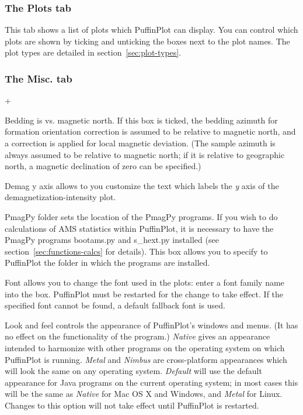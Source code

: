 \documentclass[a4paper,british]{article}
\newcommand{\menuitemlabel}[1]{%
\mbox{\textsf{#1}}\hfil}
\newenvironment{menuitemlist}%
{\begin{list}{}{%
\renewcommand{\makelabel}{\menuitemlabel}%
\setlength{\labelwidth}{35pt}%
\setlength{\leftmargin}%
             {\labelwidth+\labelsep}}}%
{\end{list}}
\newcommand{\ppcmd}[1]{\textsf{#1}} %
\newcommand{\caps}[1]{\MakeTextUppercase{#1}} %
\begin{document}
\subsubsection{The \ppcmd{Plots} tab}

This tab shows a list of plots which PuffinPlot can display. You can control
which plots are shown by ticking and unticking the boxes next to the plot
names. The plot types are detailed in section~\ref{sec:plot-types}.

\subsubsection{\label{sec:prefs-misc}The \ppcmd{Misc.} tab}

\begin{menuitemlist}

\item[Bedding is vs. magnetic north.] If this box is ticked, the bedding
  azimuth for formation orientation correction is assumed to be relative to
  magnetic north, and a correction is applied for local magnetic deviation.
  (The sample azimuth is always assumed to be relative to magnetic north; if
  it is relative to geographic north, a magnetic declination of zero can be
  specified.)

\item[Demag y axis] allows to you customize the text which labels the {\em y}
  axis of the demagnetization-intensity plot.

\item[PmagPy folder] sets the location of the PmagPy programs. If you wish to
  do calculations of \caps{ams} statistics within PuffinPlot, it is necessary
  to have the PmagPy programs \ppcmd{bootams.py} and \ppcmd{s\_hext.py}
  installed (see section~\ref{sec:functions-calcs} for details). This
  box allows you to specify to PuffinPlot the folder in which the programs
  are installed.

\item[Font] allows you to change the font used in the plots: enter a font
  family name into the box. PuffinPlot must be restarted for the change to
  take effect. If the specified font cannot be found, a default fallback font
  is used.

\item[Look and feel] controls the appearance of PuffinPlot's windows and
  menus. (It has no effect on the functionality of the program.)
  \textit{Native} gives an appearance intended to harmonize with other
  programs on the operating system on which PuffinPlot is running.
  \textit{Metal} and \textit{Nimbus} are cross-platform appearances which
  will look the same on any operating system. \textit{Default} will use the
  default appearance for Java programs on the current operating system; in
  most cases this will be the same as \textit{Native} for Mac OS X and
  Windows, and \textit{Metal} for Linux. Changes to this option will
  not take effect until PuffinPlot is restarted.


\end{menuitemlist}
\end{document}
